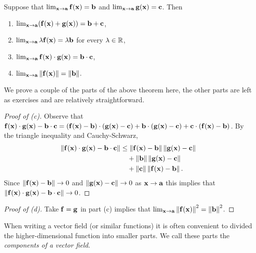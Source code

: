 \begin{theorem}
    Suppose that \(  \lim_{\mathbf{x} \to \mathbf{a}}\mathbf{f}(\mathbf{x}) = \mathbf{b}\) and \(  \lim_{\mathbf{x} \to \mathbf{a}}\mathbf{g}(\mathbf{x}) = \mathbf{c}\).
    Then
    \begin{enumerate}
        \item \(  \lim_{\mathbf{x} \to \mathbf{a}}(\mathbf{f}(\mathbf{x})+\mathbf{g}(\mathbf{x})) = \mathbf{b}+\mathbf{c}\),
        \item \(  \lim_{\mathbf{x} \to \mathbf{a}} \lambda \mathbf{f}(\mathbf{x}) = \lambda \mathbf{b}\) for every \(\lambda \in \mathbb{R}\),
        \item \(  \lim_{\mathbf{x} \to \mathbf{a}}\mathbf{f}(\mathbf{x})\cdot \mathbf{g}(\mathbf{x}) = \mathbf{b}\cdot \mathbf{c}\),
        \item \(  \lim_{\mathbf{x} \to \mathbf{a}} \left\|\mathbf{f}(\mathbf{x})\right\| = \left\|\mathbf{b}\right\|\).
    \end{enumerate}
\end{theorem}

We prove a couple of the parts of the above theorem here, the other parts are left as exercises and are relatively straightforward.

\begin{proof}[Proof of (c)]
    Observe that  \(
    \mathbf{f}(\mathbf{x})\cdot\mathbf{g}(\mathbf{x}) - \mathbf{b}\cdot \mathbf{c}
    = (\mathbf{f}(\mathbf{x})-\mathbf{b})\cdot(\mathbf{g}(\mathbf{x})-\mathbf{c}) + \mathbf{b}\cdot(\mathbf{g}(\mathbf{x})-\mathbf{c}) + \mathbf{c}\cdot(\mathbf{f}(\mathbf{x})-\mathbf{b})
    \).
    By the triangle inequality and Cauchy-Schwarz,
    \[
        \begin{aligned}
            \left\|\mathbf{f}(\mathbf{x})\cdot\mathbf{g}(\mathbf{x}) - \mathbf{b}\cdot \mathbf{c} \right\|
             & \leq \left\|\mathbf{f}(\mathbf{x})-\mathbf{b}\right\| \left\|\mathbf{g}(\mathbf{x})-\mathbf{c}\right\| \\
             & \quad + \left\|\mathbf{b}\right\|\left\|\mathbf{g}(\mathbf{x})-\mathbf{c}\right\|        \\
             & \quad + \left\|\mathbf{c}\right\| \left\|\mathbf{f}(\mathbf{x})-\mathbf{b}\right\|.
        \end{aligned}
    \]
    Since \(\left\|\mathbf{f}(\mathbf{x})-\mathbf{b}\right\| \to 0\) and \(\left\|\mathbf{g}(\mathbf{x})-\mathbf{c}\right\| \to 0\) as \(\mathbf{x} \to \mathbf{a}\) this implies that \(\left\|\mathbf{f}(\mathbf{x})\cdot\mathbf{g}(\mathbf{x}) - \mathbf{b}\cdot \mathbf{c} \right\|\to 0\).
\end{proof}

\begin{proof}[Proof of (d)]
    Take \(\mathbf{f} = \mathbf{g}\) in part (c) implies that \(   \lim_{\mathbf{x} \to \mathbf{a}} \left\|\mathbf{f}(\mathbf{x})\right\|^2 = \left\|\mathbf{b}\right\|^2\).
\end{proof}


When writing a vector field (or similar functions) it is often convenient to divided the higher-dimensional function into smaller parts.
We call these parts the \emph{components of a vector field}.

